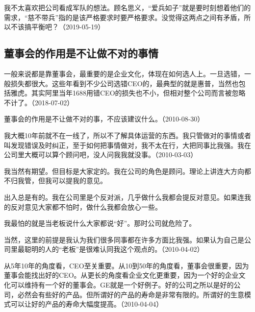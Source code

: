 我不太喜欢把公司看成军队的想法。顾名思义，“爱兵如子”就是要时刻想着他们的需求，“慈不带兵”指的是该严格要求时要严格要求。没觉得这两点之间有矛盾，所以不该搞平衡吧？（2019-05-19）

\subsection{董事会的作用是不让做不对的事情}


一般来说都是靠董事会，最重要的是企业文化，体现在如何选人上。一旦选错，一般损失都很大。这些年看到不少公司选错CEO的，最典型的就是惠普，当然也包括雅虎。其实阿里当年1688用错CEO的损失也不小，但相对整个公司而言被忽略不计了。（2018-07-02）


董事会的作用是不让做不对的事，不应该建议什么。（2010-08-30）


我大概10年前就不在一线了，所以不了解具体运营的东西。我只管做对的事情或者叫发现错误及时纠正，至于如何把事情做对，我不太在行，大把同事比我强。我在公司里大概可以算个顾问吧，没人问我我就没事。（2010-03-03）


我当然有期望。但目标是大家定的。我在公司的角色是顾问。理论上讲连大方向都不归我管，但我可以提我的意见。

出入总是有的。我在公司里是个反对派，几乎做什么我都会提反对意见。如果连我的反对意见大家都不怕时，做什么我都会放心一些。

我最怕的就是当老板说什么大家都说“好”。那时公司就危险了。

当然，这里的前提是我认为我们很多同事都在许多方面比我强。如果认为自己是公司里最聪明的人的“老板”是很难认同我这个观点的。（2010-04-02）

从5年10年的角度看，CEO至关重要。从10到50年的角度看，董事会很重要，因为董事会能找出好的CEO。从更长的角度看企业文化更重要，因为一个好的企业文化可以维持有一个好的董事会。GE就是一个好例子。好的公司之所以是好的公司，必然会有些好的产品。但所谓好的产品的寿命是非常有限的。所谓好的生意模式可以让好的产品的寿命大幅度提高。（2010-04-04）

